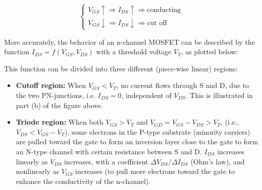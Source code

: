 \begin{itemize}
\[ 
\left\{ \begin{array}{l}
  V_{GS} \uparrow \Longrightarrow I_{DS} \uparrow \Longrightarrow \mbox{conducting} \\
  V_{GS} \downarrow \Longrightarrow I_{DS} \downarrow \Longrightarrow \mbox{cut off} 
\end{array} \right. 	
\]


More accurately, the behavior of an n-channel MOSFET can be described by the 
function $I_{DS}=f(V_{GS}, V_{DS})$ with a threshold voltage $V_T$, as plotted 
below:



This function can be divided into three different (piece-wise linear) regions:

\begin{itemize}
  \item {\bf Cutoff region:} When $V_{GS}<V_T$, no current flows through S 
    and D, due to the two PN-junctions, i.e. $I_{DS}=0$, independent of 
    $V_{DS}$. This is illustrated in part (b) of the figure above.

  \item {\bf Triode region:} When both $V_{GS}>V_T$ and $V_{GD}=V_{GS}-V_{DS}>V_T$,
    (i.e., $V_{DS}<V_{GS}-V_T$), some electrons in the P-type substrate 
    (minority carriers) are pulled toward the gate to form an inversion 
    layer close to the gate to form an N-type channel with certain 
    resistance between S and D. $I_{DS}$ increases linearly as $V_{DS}$ 
    increases, with a coefficient $\Delta V_{DS}/\Delta I_{DS}$ (Ohm's law), 
    and nonlinearly as $V_{GS}$ increases (to pull more electrons toward 
    the gate to enhance the conductivity of the n-channel).


\end{itemize}
\end{itemize}
